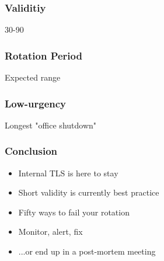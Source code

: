 
\begin{frame}
\frametitle{Validitiy}

30-90

\end{frame}

\begin{frame}
\frametitle{Rotation Period}

Expected range

\end{frame}

\begin{frame}
\frametitle{Low-urgency}

Longest "office shutdown"
\end{frame}

\begin{frame}
\frametitle{Conclusion}

\begin{itemize}
\item Internal TLS is here to stay
\item Short validity is currently best practice
\item Fifty ways to fail your rotation
\item Monitor, alert, fix \pause
\item ...or end up in a post-mortem meeting
\end{itemize}
\end{frame}






